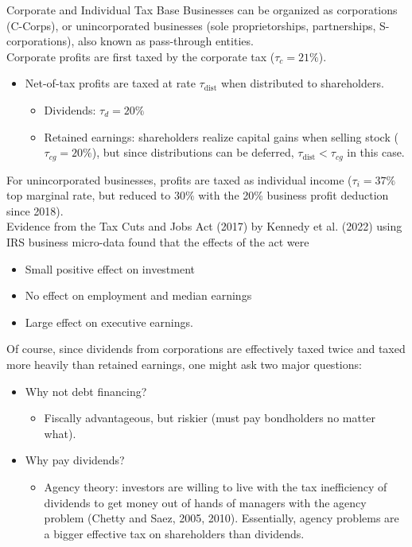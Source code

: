 \documentclass[10pt]{extarticle}
\begin{document}
  \begin{problem}{Corporate and Individual Tax Base}
    Businesses can be organized as corporations (C-Corps), or unincorporated businesses (sole proprietorships, partnerships, S-corporations), also known as pass-through entities.\\

    Corporate profits are first taxed by the corporate tax ($\tau_c = 21\%$).
    \begin{itemize}
      \item Net-of-tax profits are taxed at rate $\tau_{\text{dist}}$ when distributed to shareholders.
        \begin{itemize}
          \item Dividends: $\tau_{d} = 20\%$
          \item Retained earnings: shareholders realize capital gains when selling stock ($\tau_{cg} = 20\%$), but since distributions can be deferred, $\tau_{\text{dist}} < \tau_{cg}$ in this case.
        \end{itemize}
    \end{itemize}
    For unincorporated businesses, profits are taxed as individual income ($\tau_i = 37\%$ top marginal rate, but reduced to $30\%$ with the 20\% business profit deduction since 2018).\\

    Evidence from the Tax Cuts and Jobs Act (2017) by Kennedy et al. (2022) using IRS business micro-data found that the effects of the act were
    \begin{itemize}
      \item Small positive effect on investment
      \item No effect on employment and median earnings
      \item Large effect on executive earnings.
    \end{itemize}
    Of course, since dividends from corporations are effectively taxed twice and taxed more heavily than retained earnings, one might ask two major questions:
    \begin{itemize}
      \item Why not debt financing?
        \begin{itemize}
          \item Fiscally advantageous, but riskier (must pay bondholders no matter what).
        \end{itemize}
      \item Why pay dividends?
        \begin{itemize}
          \item Agency theory: investors are willing to live with the tax inefficiency of dividends to get money out of hands of managers with the agency problem (Chetty and Saez, 2005, 2010). Essentially, agency problems are a bigger effective tax on shareholders than dividends.
        \end{itemize}
    \end{itemize}
  \end{problem}
\end{document}
